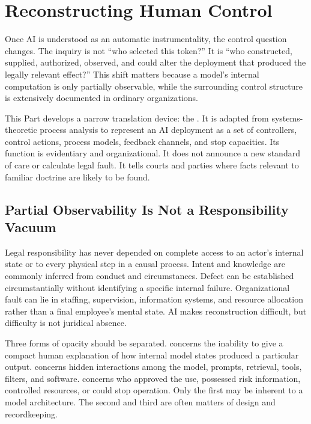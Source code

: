 \section{Reconstructing Human Control}
\label{sec:control}

Once AI is understood as an automatic instrumentality, the control question changes. The inquiry is not ``who selected this token?'' It is ``who constructed, supplied, authorized, observed, and could alter the deployment that produced the legally relevant effect?'' This shift matters because a model's internal computation is only partially observable, while the surrounding control structure is extensively documented in ordinary organizations.

This Part develops a narrow translation device: the \Cascade. It is adapted from systems-theoretic process analysis to represent an AI deployment as a set of controllers, control actions, process models, feedback channels, and stop capacities. Its function is evidentiary and organizational. It does not announce a new standard of care or calculate legal fault. It tells courts and parties where facts relevant to familiar doctrine are likely to be found.

\subsection{Partial Observability Is Not a Responsibility Vacuum}

Legal responsibility has never depended on complete access to an actor's internal state or to every physical step in a causal process. Intent and knowledge are commonly inferred from conduct and circumstances. Defect can be established circumstantially without identifying a specific internal failure. Organizational fault can lie in staffing, supervision, information systems, and resource allocation rather than a final employee's mental state. AI makes reconstruction difficult, but difficulty is not juridical absence.

Three forms of opacity should be separated.  concerns the inability to give a compact human explanation of how internal model states produced a particular output.  concerns hidden interactions among the model, prompts, retrieval, tools, filters, and software.  concerns who approved the use, possessed risk information, controlled resources, or could stop operation. Only the first may be inherent to a model architecture. The second and third are often matters of design and recordkeeping.


